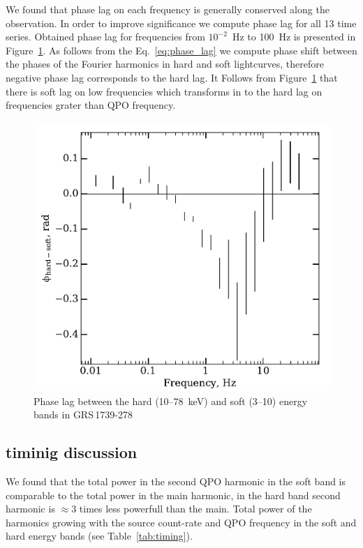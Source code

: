 \documentclass[a4paper,fleqn,usenatbib]{mnras}
\def\grs{{GRS\,1739-278\,}}
\begin{document}
We found that phase lag on each frequency is generally conserved along the observation.
In order to improve significance we compute phase lag for all 13 time series.
Obtained phase lag for frequencies from $10^{-2}$~Hz to 100~Hz is presented in Figure~\ref{fig:phase_lag}.
As follows from the Eq.~\ref{eq:phase_lag} we compute phase shift between the phases of the Fourier harmonics in hard and soft lightcurves, therefore negative phase lag corresponds to the hard lag.
It Follows from Figure~\ref{fig:phase_lag} that there is soft lag on low frequencies which transforms in to the hard lag on frequencies grater than QPO frequency. 

\begin{figure}
        \includegraphics[width=\columnwidth]{Phase_lag.pdf}
        \caption{Phase lag between the hard (10--78~keV) and soft (3--10) energy bands in \grs}
        \label{fig:phase_lag}
\end{figure}

\subsection{timinig discussion}
We found that the total power in the second QPO harmonic in the soft band is comparable to the total power in the main harmonic, in the hard band second harmonic is $\approx3$ times less powerfull than the main. 
Total power of the harmonics growing with the source count-rate and QPO frequency in the soft and hard energy bands (see Table~\ref{tab:timing}). 
\end{document}
